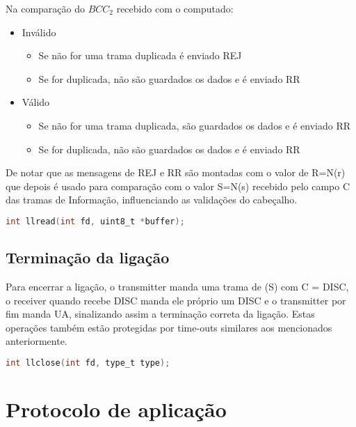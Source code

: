 \documentclass[a4paper,11pt,portuguese]{article}
\begin{document}
    \noindent Na comparação do $BCC_2$ recebido com o computado:
    \begin{itemize}
        \item Inválido
            \begin{itemize}
                \item Se não for uma trama duplicada é enviado REJ
                \item Se for duplicada, não são guardados os dados e é enviado RR
            \end{itemize}
        \item Válido
            \begin{itemize}
                \item Se não for uma trama duplicada, são guardados os dados e é enviado RR
                \item Se for duplicada, não são guardados os dados e é enviado RR
            \end{itemize}
    \end{itemize}

    \noindent De notar que as mensagens de REJ e RR são montadas com o valor de R=N(r) que depois é
    usado para comparação com o valor S=N(s) recebido pelo campo C das tramas de Informação,
    influenciando as validações do cabeçalho.

\begin{lstlisting}[language=C]
int llread(int fd, uint8_t *buffer);
\end{lstlisting}

    \subsection{Terminação da ligação}

    Para encerrar a ligação, o transmitter manda uma trama de (S) com C = DISC, o receiver quando
    recebe DISC manda ele próprio um DISC e o transmitter por fim manda UA, sinalizando assim
    a terminação correta da ligação. Estas operações também estão protegidas por time-outs similares
    aos mencionados anteriormente.

\begin{lstlisting}[language=C]
int llclose(int fd, type_t type);
\end{lstlisting}


\section{Protocolo de aplicação}
\end{document}
